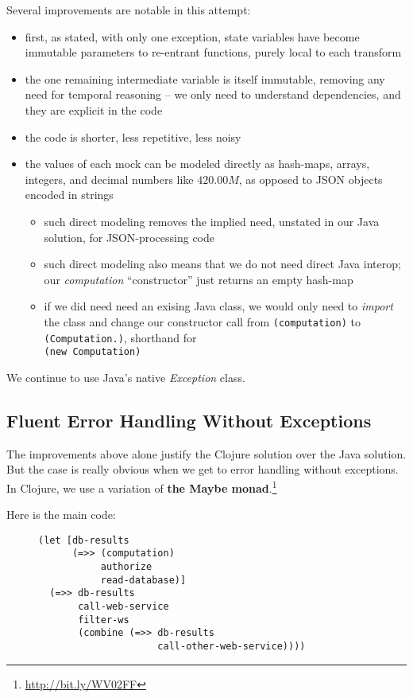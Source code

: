 \documentclass[11pt]{article}
\begin{document}
Several improvements are notable in this attempt:
\begin{itemize}
\item first, as stated, with only one exception, state variables have
become immutable parameters to re-entrant functions, purely local
to each transform
\item the one remaining intermediate variable is itself immutable,
removing any need for temporal reasoning -- we only need to
understand dependencies, and they are explicit in the code
\item the code is shorter, less repetitive, less noisy
\item the values of each mock can be modeled directly as hash-maps,
arrays, integers, and decimal numbers like $420.00M$, as opposed
to JSON objects encoded in strings
\begin{itemize}
\item such direct modeling removes the implied need, unstated in our
Java solution, for JSON-processing code
\item such direct modeling also means that we do not need direct Java
interop; our \emph{computation} ``constructor'' just returns an empty
hash-map
\item if we did need need an exising Java class, we would only need to
      \emph{import} the class and change our constructor call from
      \verb|(computation)| to \verb|(Computation.)|, shorthand for \\
      \verb|(new Computation)|
\end{itemize}
\end{itemize}

We continue to use Java's native \emph{Exception} class.
\subsection{Fluent Error Handling Without Exceptions}
\label{sec-3-2}

The improvements above alone justify the Clojure solution over the
Java solution. But the case is really obvious when we get to error
handling without exceptions. In Clojure, we use a variation of
\textbf{the Maybe monad}.\footnote{\url{http://bit.ly/WV02FF}}

Here is the main code:
\begin{figure}[H]
\label{monadic-main}
\begin{verbatim}
(let [db-results
      (=>> (computation)
           authorize
           read-database)]
  (=>> db-results
       call-web-service
       filter-ws
       (combine (=>> db-results
                     call-other-web-service))))
\end{verbatim}
\end{figure}
\end{document}
